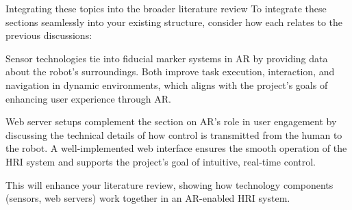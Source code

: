Integrating these topics into the broader literature review
To integrate these sections seamlessly into your existing structure, consider how each relates to the previous discussions:

Sensor technologies tie into fiducial marker systems in AR by providing data about the robot's surroundings. Both improve task execution, interaction, and navigation in dynamic environments, which aligns with the project's goals of enhancing user experience through AR.

Web server setups complement the section on AR’s role in user engagement by discussing the technical details of how control is transmitted from the human to the robot. A well-implemented web interface ensures the smooth operation of the HRI system and supports the project's goal of intuitive, real-time control.

This will enhance your literature review, showing how technology components (sensors, web servers) work together in an AR-enabled HRI system.
